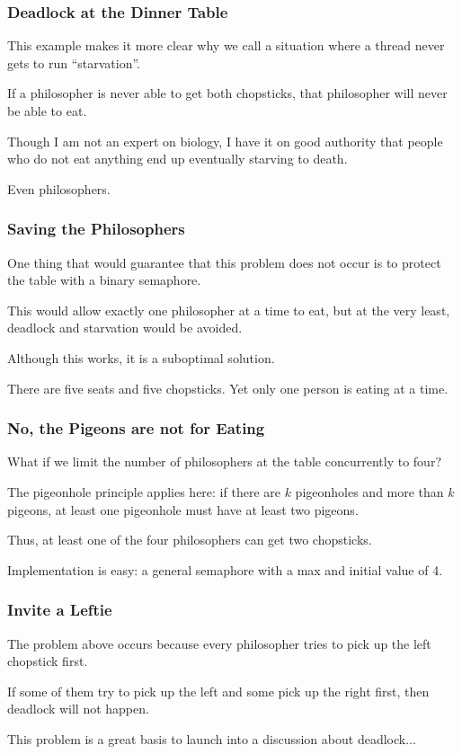 \begin{frame}
\frametitle{Deadlock at the Dinner Table}

This example makes it more clear why we call a situation where a thread never gets to run ``starvation''. 

If a philosopher is never able to get both chopsticks, that philosopher will never be able to eat.

Though I am not an expert on biology, I have it on good authority that people who do not eat anything end up eventually starving to death. 

Even philosophers.

\end{frame}

\begin{frame}
\frametitle{Saving the Philosophers}

One thing that would guarantee that this problem does not occur is to protect the table with a binary semaphore. 

This would allow exactly one philosopher at a time to eat, but at the very least, deadlock and starvation would be avoided. 

Although this works, it is a suboptimal solution. 

There are five seats and five chopsticks. Yet only one person is eating at a time. 

\end{frame}


\begin{frame}
\frametitle{No, the Pigeons are not for Eating}

What if we limit the number of philosophers at the table concurrently to four? 

The pigeonhole principle applies here: if there are $k$ pigeonholes and more than $k$ pigeons, at least one pigeonhole must have at least two pigeons. 

Thus, at least one of the four philosophers can get two chopsticks. 

Implementation is easy: a general semaphore with a max and initial value of 4.

\end{frame}

\begin{frame}
\frametitle{Invite a Leftie}

The problem above occurs because every philosopher tries to pick up the left chopstick first. 

If some of them try to pick up the left and some pick up the right first, then deadlock will not happen.

This problem is a great basis to launch into a discussion about deadlock...

\end{frame}




